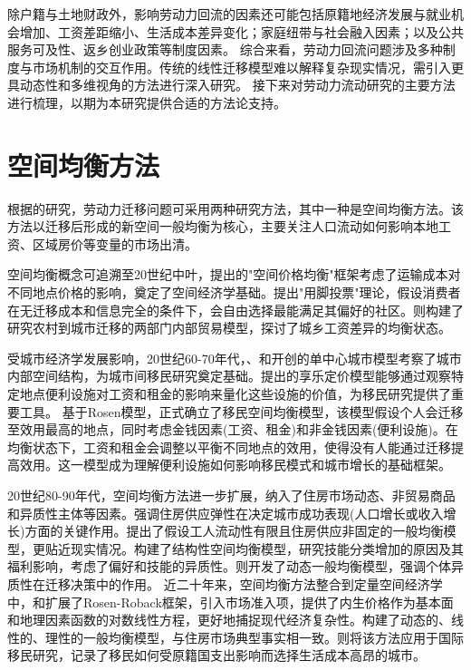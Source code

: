 \documentclass[master, final]{zufe-thesis}
\begin{document}
除户籍与土地财政外，影响劳动力回流的因素还可能包括原籍地经济发展与就业机会增加、工资差距缩小、生活成本差异变化；家庭纽带与社会融入因素；以及公共服务可及性、返乡创业政策等制度因素。
综合来看，劳动力回流问题涉及多种制度与市场机制的交互作用。传统的线性迁移模型难以解释复杂现实情况，需引入更具动态性和多维视角的方法进行深入研究。
接下来对劳动力流动研究的主要方法进行梳理，以期为本研究提供合适的方法论支持。


\section{空间均衡方法}

根据\textcite{jiaEconomicsInternalMigration2023}的研究，劳动力迁移问题可采用两种研究方法，其中一种是空间均衡方法。该方法以迁移后形成的新空间一般均衡为核心，主要关注人口流动如何影响本地工资、区域房价等变量的市场出清。

空间均衡概念可追溯至20世纪中叶，\textcite{samuelsonSpatialPriceEquilibrium1952}提出的"空间价格均衡"框架考虑了运输成本对不同地点价格的影响，奠定了空间经济学基础。\textcite{tieboutPureTheoryLocal1956}提出"用脚投票"理论，假设消费者在无迁移成本和信息完全的条件下，会自由选择最能满足其偏好的社区。\textcite{harrisMigrationUnemploymentDevelopment1970}则构建了研究农村到城市迁移的两部门内部贸易模型，探讨了城乡工资差异的均衡状态。

受城市经济学发展影响，20世纪60-70年代，\textcite{alonsoLocationLandUse1964}、\textcite{muthCitiesHousingSpatial1969}和\textcite{millsAggregativeModelResource1967}开创的单中心城市模型考察了城市内部空间结构，为城市间移民研究奠定基础。\textcite{rosenHedonicPricesImplicit1974}提出的享乐定价模型能够通过观察特定地点便利设施对工资和租金的影响来量化这些设施的价值，为移民研究提供了重要工具。
基于Rosen模型，\textcite{robackWagesRentsQuality1982}正式确立了移民空间均衡模型，该模型假设个人会迁移至效用最高的地点，同时考虑金钱因素(工资、租金)和非金钱因素(便利设施)。在均衡状态下，工资和租金会调整以平衡不同地点的效用，使得没有人能通过迁移提高效用。这一模型成为理解便利设施如何影响移民模式和城市增长的基础框架。

20世纪80-90年代，空间均衡方法进一步扩展，纳入了住房市场动态、非贸易商品和异质性主体等因素。\textcite{glaeserWealthCitiesAgglomeration2009}强调住房供应弹性在决定城市成功表现(人口增长或收入增长)方面的关键作用。\textcite{morettiLocalLaborMarkets2011}提出了假设工人流动性有限且住房供应非固定的一般均衡模型，更贴近现实情况。\textcite{diamondDeterminantsWelfareImplications2016}构建了结构性空间均衡模型，研究技能分类增加的原因及其福利影响，考虑了偏好和技能的异质性。\textcite{coen-piraniEffectHouseholdAppliances2010}则开发了动态一般均衡模型，强调个体异质性在迁移决策中的作用。
近二十年来，空间均衡方法整合到定量空间经济学中，\textcite{ahlfeldtEconomicsDensityEvidence2015}和\textcite{reddingQuantitativeSpatialEconomics2017}扩展了Rosen-Roback框架，引入市场准入项，提供了内生价格作为基本面和地理因素函数的对数线性方程，更好地捕捉现代经济复杂性。\textcite{glaeserHousingDynamicsUrban2014}构建了动态的、线性的、理性的一般均衡模型，与住房市场典型事实相一致。\textcite{albertImmigrationSpatialEquilibrium2022}则将该方法应用于国际移民研究，记录了移民如何受原籍国支出影响而选择生活成本高昂的城市。
\end{document}
